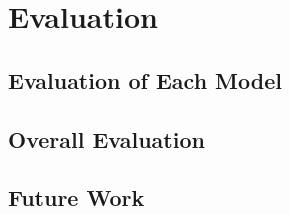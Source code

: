 
\chapter{Evaluation}

\section{Evaluation of Each Model}
\section{Overall Evaluation}
\section{Future Work}

